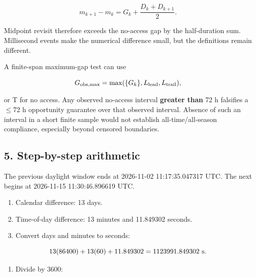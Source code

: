 \documentclass[10pt,a4paper]{article}
\numberwithin{equation}{section}
\begin{document}
\begin{equation}m_{k+1}-m_k=G_k+\frac{D_k+D_{k+1}}{2}.\label{eq:ch9-3}\end{equation}

\begin{sloppypar}Midpoint revisit therefore exceeds the no-access gap by the half-duration sum. Millisecond events make the numerical difference small, but the definitions remain different.\end{sloppypar}


\begin{sloppypar}A finite-span maximum-gap test can use\end{sloppypar}


\begin{equation}G_{\rm obs,max}=\max(\{G_k\},L_{\rm lead},L_{\rm trail}),\label{eq:ch9-4}\end{equation}

\begin{sloppypar}or T for no access. Any observed no-access interval \textbf{greater than} 72 h falsifies a \ensuremath{\le}72 h opportunity guarantee over that observed interval. Absence of such an interval in a short finite sample would not establish all-time/all-season compliance, especially beyond censored boundaries.\end{sloppypar}


\subsection*{5. Step-by-step arithmetic}
\begin{sloppypar}The previous daylight window ends at 2026-11-02 11:17:35.047317 UTC. The next begins at 2026-11-15 11:30:46.896619 UTC.\end{sloppypar}


\begin{enumerate}
\item Calendar difference: 13 days.
\item Time-of-day difference: 13 minutes and 11.849302 seconds.
\item Convert days and minutes to seconds:
\end{enumerate}

\begin{equation}13(86400)+13(60)+11.849302
=1123991.849302\ {\rm s}.\label{eq:ch9-5}\end{equation}

\begin{enumerate}[start=4]
\item Divide by 3600:
\end{enumerate}
\end{document}
